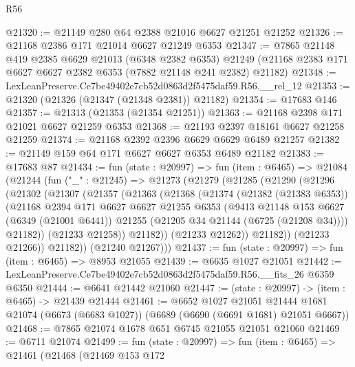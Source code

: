 \begin{lexlean}{R56}
\begin{coremodule}
@21320 := @21149 @280 @64 @2388 @21016 @6627 @21251 @21252
@21326 := @21168 @2386 @171 @21014 @6627 @21249 @6353
@21347 := @7865
    @21148
    @419
    @2385
    @6629
    @21013
    (@6348 @2382 @6353)
    @21249
    (@21168 @2383 @171 @6627 @6627 @2382 @6353 (@7882 @21148 @241 @2382) @21182)
@21348 := LexLeanPreserve.Ce7be49402e7cb52d0863d2f5475daf59.R56.__rel_12
@21353 := @21320 (@21326 (@21347 (@21348 @2381)) @21182)
@21354 := @17683 @146
@21357 := @21313 (@21353 (@21354 @21251))
@21363 := @21168 @2398 @171 @21021 @6627 @21259 @6353
@21368 := @21193 @2397 @18161 @6627 @21258 @21259
@21374 := @21168 @2392 @2396 @6629 @6629 @6489 @21257
@21382 := @21149 @159 @64 @171 @6627 @6627 @6353 @6489 @21182
@21383 := @17683 @87
@21434 := fun (state : @20997) =>
  fun (item : @6465) =>
  @21084
    (@21244
      (fun ("_" : @21245) =>
      @21273
        (@21279
          (@21285
            (@21290
              (@21296
                (@21302
                  (@21307
                    (@21357
                      (@21363
                        (@21368
                          (@21374
                            (@21382 (@21383 @6353))
                            (@21168
                              @2394
                              @171
                              @6627
                              @6627
                              @21255
                              @6353
                              (@9413
                                @21148
                                @153
                                @6627
                                (@6349 (@21001 @6441))
                                @21255
                                (@21205 @34 @21144 (@6725 (@21208 @34))))
                              @21182))
                          (@21233 @21258))
                        @21182))
                    (@21233 @21262))
                  @21182))
              (@21233 @21266))
            @21182))
        (@21240 @21267)))
@21437 := fun (state : @20997) => fun (item : @6465) => @8953 @21055
@21439 := @6635 @1027 @21051
@21442 := LexLeanPreserve.Ce7be49402e7cb52d0863d2f5475daf59.R56.__fits_26 @6359 @6350
@21444 := @6641 @21442 @21060
@21447 := (state : @20997) -> (item : @6465) -> @21439 @21444
@21461 := @6652
    @1027
    @21051
    @21444
    @1681
    @21074
    (@6673 (@6683 @1027))
    (@6689 (@6690 (@6691 @1681) @21051 @6667))
@21468 := @7865 @21074 @1678 @651 @6745 @21055 @21051 @21060
@21469 := @6711 @21074
@21499 := fun (state : @20997) =>
  fun (item : @6465) =>
  @21461
    (@21468
      (@21469
        @153
        @172

\end{coremodule}
\end{lexlean}
